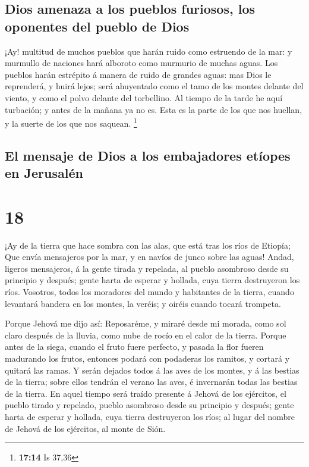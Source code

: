 \hypertarget{dios-amenaza-a-los-pueblos-furiosos-los-oponentes-del-pueblo-de-dios}{%
\subsection{Dios amenaza a los pueblos furiosos, los oponentes del
pueblo de
Dios}\label{dios-amenaza-a-los-pueblos-furiosos-los-oponentes-del-pueblo-de-dios}}

 ¡Ay! multitud de muchos pueblos que harán ruido como
estruendo de la mar: y murmullo de naciones hará alboroto como murmurio
de muchas aguas.  Los pueblos harán estrépito á manera de
ruido de grandes aguas: mas Dios le reprenderá, y huirá lejos; será
ahuyentado como el tamo de los montes delante del viento, y como el
polvo delante del torbellino.  Al tiempo de la tarde he
aquí turbación; y antes de la mañana ya no es. Esta es la parte de los
que nos huellan, y la suerte de los que nos saquean. \footnote{\textbf{17:14}
  Is 37,36}

\hypertarget{el-mensaje-de-dios-a-los-embajadores-etuxedopes-en-jerusaluxe9n}{%
\subsection{El mensaje de Dios a los embajadores etíopes en
Jerusalén}\label{el-mensaje-de-dios-a-los-embajadores-etuxedopes-en-jerusaluxe9n}}

\hypertarget{section-17}{%
\section{18}\label{section-17}}

 ¡Ay de la tierra que hace sombra con las alas, que está
tras los ríos de Etiopía;  Que envía mensajeros por la
mar, y en navíos de junco sobre las aguas! Andad, ligeros mensajeros, á
la gente tirada y repelada, al pueblo asombroso desde su principio y
después; gente harta de esperar y hollada, cuya tierra destruyeron los
ríos.  Vosotros, todos los moradores del mundo y
habitantes de la tierra, cuando levantará bandera en los montes, la
veréis; y oiréis cuando tocará trompeta.

 Porque Jehová me dijo así: Reposaréme, y miraré desde mi
morada, como sol claro después de la lluvia, como nube de rocío en el
calor de la tierra.  Porque antes de la siega, cuando el
fruto fuere perfecto, y pasada la flor fueren madurando los frutos,
entonces podará con podaderas los ramitos, y cortará y quitará las
ramas.  Y serán dejados todos á las aves de los montes, y
á las bestias de la tierra; sobre ellos tendrán el verano las aves, é
invernarán todas las bestias de la tierra.  En aquel
tiempo será traído presente á Jehová de los ejércitos, el pueblo tirado
y repelado, pueblo asombroso desde su principio y después; gente harta
de esperar y hollada, cuya tierra destruyeron los ríos; al lugar del
nombre de Jehová de los ejércitos, al monte de Sión.

